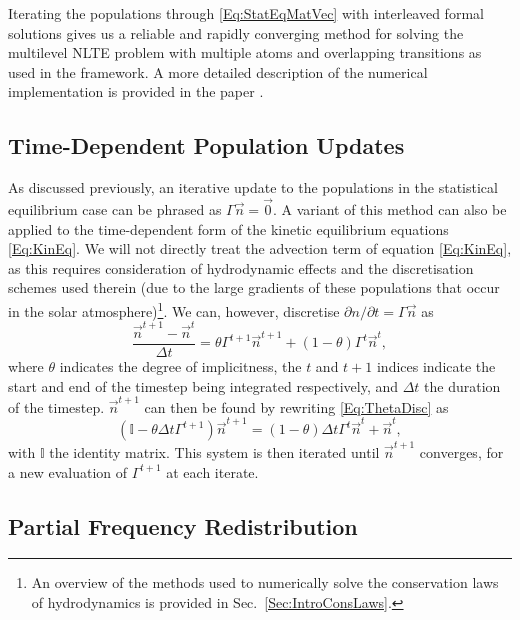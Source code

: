 Iterating the populations through \eqref{Eq:StatEqMatVec} with interleaved formal solutions gives us a reliable and rapidly converging method for solving the multilevel NLTE problem with multiple atoms and overlapping transitions as used in the \Lw{} framework.
A more detailed description of the numerical implementation is provided in the \Lw{} paper \citep{Osborne2021}.

\subsection{Time-Dependent Population Updates}\label{Sec:TimeDepPopUpdates}

As discussed previously, an iterative update to the populations in the statistical equilibrium case can be phrased as $\Gamma \vec{n} = \vec{0}$.
A variant of this method can also be applied to the time-dependent form of the kinetic equilibrium equations \eqref{Eq:KinEq}.
We will not directly treat the advection term of equation \eqref{Eq:KinEq}, as this requires consideration of hydrodynamic effects and the discretisation schemes used therein (due to the large gradients of these populations that occur in the solar atmosphere)\footnote{An overview of the methods used to numerically solve the conservation laws of hydrodynamics is provided in Sec.~\ref{Sec:IntroConsLaws}.}.
We can, however, discretise $\partial n / \partial t = \Gamma \vec{n}$ as
\begin{equation}
    \label{Eq:ThetaDisc}
    \frac{\vec{n}^{t+1} - \vec{n}^t}{\Delta t} = \theta \Gamma^{t+1} \vec{n}^{t+1} + (1-\theta)\Gamma^{t} \vec{n}^{t},
\end{equation}
where $\theta$ indicates the degree of implicitness, the $t$ and $t+1$ indices indicate the start and end of the timestep being integrated respectively, and $\Delta t$ the duration of the timestep.
$\vec{n}^{t+1}$ can then be found by rewriting \eqref{Eq:ThetaDisc} as
\begin{equation}
    \label{Eq:TimeDepSystem}
    (\mathbb{I} - \theta\Delta t \Gamma^{t+1}) \vec{n}^{t+1} = (1-\theta)\Delta t \Gamma^{t}\vec{n}^{t} + \vec{n}^{t},
\end{equation}
with $\mathbb{I}$ the identity matrix.
This system is then iterated until $\vec{n}^{t+1}$ converges, for a new evaluation of $\Gamma^{t+1}$ at each iterate.

\subsection{Partial Frequency Redistribution}\label{Sec:Prd}

